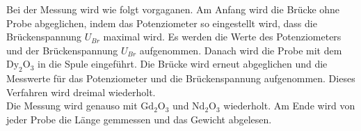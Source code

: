 Bei der Messung wird wie folgt vorgaganen. Am Anfang wird die Brücke ohne Probe abgeglichen, indem das Potenziometer so eingestellt wird, dass die Brückenspannung $ U_{Br}$ maximal wird. Es werden die Werte des Potenziometers und der Brückenspannung $U_{Br} $ aufgenommen. Danach wird die Probe mit dem $\text{Dy}_2\text{O}_3$ in die Spule eingeführt.
Die Brücke wird erneut abgeglichen und die Messwerte für das Potenziometer und die Brückenspannung aufgenommen. Dieses Verfahren wird dreimal wiederholt.\\
Die Messung wird genauso mit $\text{Gd}_2\text{O}_3$ und $\text{Nd}_2\text{O}_3$ wiederholt. Am Ende wird von jeder Probe die Länge gemmessen und das Gewicht abgelesen.\\
